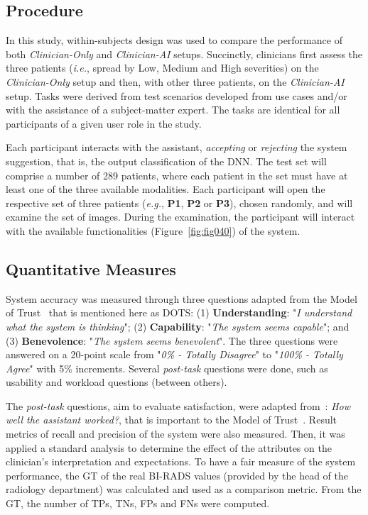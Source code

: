 \subsection{Procedure}
\label{sec:app002005004}

In this study, within-subjects design was used to compare the performance of both {\it Clinician-Only} and {\it Clinician-AI} setups.
Succinctly, clinicians first assess the three patients ({\it i.e.}, spread by Low, Medium and High severities) on the {\it Clinician-Only} setup and then, with other three patients, on the {\it Clinician-AI} setup.
Tasks were derived from test scenarios developed from use cases and/or with the assistance of a subject-matter expert.
The tasks are identical for all participants of a given user role in the study.

Each participant interacts with the assistant, {\it accepting} or {\it rejecting} the system suggestion, that is, the output classification of the \ac{DNN}.
The test set will comprise a number of 289 patients, where each patient in the set must have at least one of the three available modalities.
Each participant will open the respective set of three patients ({\it e.g.}, {\bf P1}, {\bf P2} or {\bf P3}), chosen randomly, and will examine the set of images.
During the examination, the participant will interact with the available functionalities (Figure~\ref{fig:fig040}) of the system.

\subsection{Quantitative Measures}
\label{sec:app002005005}

System accuracy was measured through three questions adapted from the Model of Trust~\cite{schoorman2016perspective} that is mentioned here as \ac{DOTS}: (1) {\bf Understanding}: "{\it I understand what the system is thinking}"; (2) {\bf Capability}: "{\it The system seems capable}"; and (3) {\bf Benevolence}: "{\it The system seems benevolent}".
The three questions were answered on a 20-point scale from "{\it 0\% - Totally Disagree}" to "{\it 100\% - Totally Agree}" with 5\% increments.
Several {\it post-task} questions were done, such as usability and workload questions (between others).

The {\it post-task} questions, aim to evaluate satisfaction, were adapted from~\cite{Kocielnik:2019:YAI:3290605.3300641}: {\it How well the assistant worked?}, that is important to the Model of Trust~\cite{basheer2015certainty, khalid2016prediction}.
Result metrics of recall and precision of the system were also measured.
Then, it was applied a standard analysis to determine the effect of the attributes on the clinician's interpretation and expectations.
To have a fair measure of the system performance, the \ac{GT} of the real \ac{BI-RADS} values (provided by the head of the radiology department) was calculated and used as a comparison metric.
From the \ac{GT}, the number of \acfp{TP}, \acfp{TN}, \acfp{FP} and \acfp{FN} were computed.

